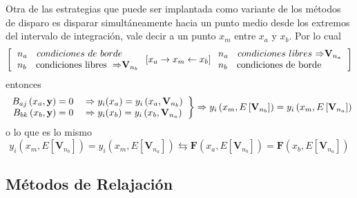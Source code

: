 \documentclass[spanish,titlepage,11pt]{article}
\begin{document}
Otra de las estrategias que puede ser implantada como variante de los
m\'{e}todos de disparo es disparar simult\'{a}neamente hacia un punto medio
desde los extremos del intervalo de integraci\'{o}n, vale decir a un punto
$x_{m}$ entre $x_{a}$ y $x_{b}.$ Por lo cual
\[
\left[  \left.
\begin{array}
[c]{l}%
n_{a}\quad{\normalsize condiciones\ de\ borde}\\
n_{b}\quad\mathrm{condiciones\ libres\ \Rightarrow}\mathbf{V}_{n_{b}}%
\end{array}
\right.  \left[  x_{a}\rightarrow x_{m}\leftarrow x_{b}\right]  \left.
\begin{array}
[c]{l}%
n_{a}\quad{\normalsize condiciones\ libres}\mathrm{\ \Rightarrow}%
\mathbf{V}_{n_{a}}\\
n_{b}\quad\mathrm{condiciones\ de\ borde}%
\end{array}
\right.  \right]
\]
entonces
\[
\left.
\begin{array}
[c]{c}%
B_{aj}\left(  x_{a},\mathbf{y}\right)  =0\quad\Rightarrow y_{i}(x_{a}%
)=y_{i}\left(  x_{a},\mathbf{V}_{n_{b}}\right) \\
B_{bk}\left(  x_{b},\mathbf{y}\right)  =0\quad\Rightarrow y_{i}(x_{b}%
)=y_{i}\left(  x_{b},\mathbf{V}_{n_{a}}\right)
\end{array}
\right\}  \Rightarrow y_{i}\left(  x_{m},E\left[  \mathbf{V}_{n_{b}}\right]
\right)  =y_{i}\left(  x_{m},E\left[  \mathbf{V}_{n_{a}}\right]  \right)
\]
o lo que es lo mismo
\[
y_{i}\left(  x_{m},E\left[  \mathbf{V}_{n_{b}}\right]  \right)  =y_{i}\left(
x_{m},E\left[  \mathbf{V}_{n_{a}}\right]  \right)  \leftrightarrows
\mathbf{F}\left(  x_{a},E\left[  \mathbf{V}_{n_{b}}\right]  \right)
=\mathbf{F}\left(  x_{b},E\left[  \mathbf{V}_{n_{a}}\right]  \right)
\]

\subsection{M\'{e}todos de Relajaci\'{o}n}
\end{document}

